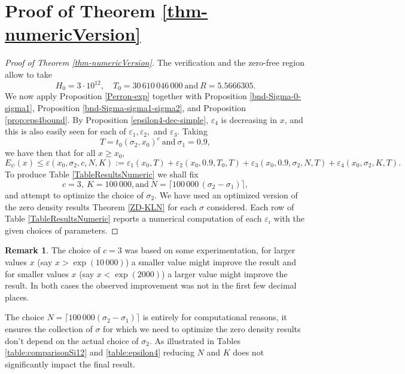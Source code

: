 \documentclass[10pt]{amsart}
\newcommand{\s}{\sigma}
\theoremstyle{definition}
\newtheorem{Rem}[prop]{Remark}
\numberwithin{equation}{section}
\begin{document}
\section{Proof of Theorem \ref{thm-numericVersion}}\label{sec:numeric}

\begin{proof}[Proof of Theorem \ref{thm-numericVersion}]
The verification \cite{PlaTru21RH} and the zero-free region \cite{TrudMos15} allow to take \[ H_0 = 3\cdot 10^{12},\quad T_0=30\,610\,046\,000\ \text{and}\ R= 5.5666305.\] 
We now apply Proposition \ref{Perron-exp} together with Proposition \ref{bnd-Sigma-0-sigma1}, Proposition \ref{bnd-Sigma-sigma1-sigma2}, and Proposition \ref{prop:eps4bound}.
By Proposition \ref{epsilon4-dec-simple}, $\varepsilon_4$ is decreasing in $x$, and 
this is also easily seen for each of $\varepsilon_1, \varepsilon_2,$ and $\varepsilon_3$. 
Taking 
\[T=t_0(\sigma_2,x_0)^c \ \text{and}\ 
\s_1 = 0.9,
\] we have then that for all $x\ge x_0$,
\begin{equation}
\label{def-epsilon} 
E_{\psi}(x) \le  \varepsilon(x_0,\s_2,c, N, K) := \varepsilon_1(x_0,T) + \varepsilon_2(x_0,0.9,T_0,T) + \varepsilon_3(x_0,0.9,\s_2,N,T) + \varepsilon_4(x_0,\sigma_2,K,T). 
\end{equation}
%
To produce Table  \ref{TableResultsNumeric} we shall fix
\begin{equation}\label{vals-param}
c=3, \ K = 100\,000, \text{and}\ N=\lceil100\,000\,(\s_2-\s_1) \rceil,
\end{equation}
and attempt to optimize the choice of $\s_2$.
We have used an optimized version of the zero density results Theorem \ref{ZD-KLN} for each $\sigma$ considered.
Each row of Table \ref{TableResultsNumeric} reports a numerical computation of each $\varepsilon_i$ with the given choices of parameters.
\end{proof}

\begin{Rem}
The choice of $c=3$ was based on some experimentation, for larger values $x$ (say $x>\exp(10\,000)$) a smaller value might improve the result and for smaller values $x$ (say $x<\exp(2000)$) a larger value might improve the result. 
In both cases the observed improvement was not in the first few decimal places.

The choice $N=\lceil100\,000(\s_2-\s_1)\rceil$ is entirely for computational reasons, it ensures the collection of $\s$ for which we need to optimize the zero density results don't depend on the actual choice of $\s_2$.
As illustrated in Tables \ref{table:comparisonSi12} and \ref{table:epsilon4} reducing $N$ and $K$ does not significantly impact the final result.
\end{Rem}
\end{document}
